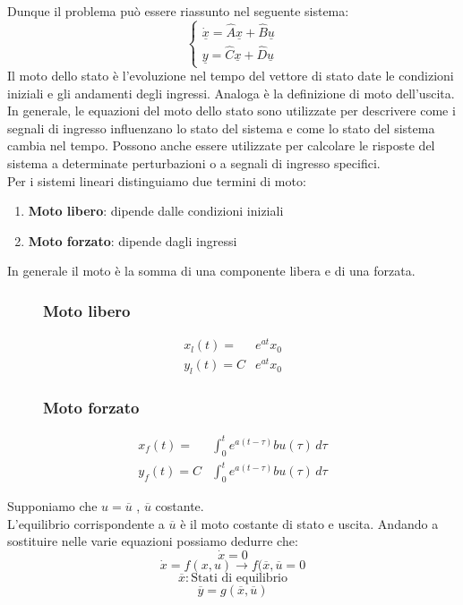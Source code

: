 	Dunque il problema può essere riassunto nel seguente sistema:
	\begin{equation*}
		\begin{cases}
			\underline{\dot{x}} = \hat{A}\underline{x}+ \hat{B}\underline{u}\\
			\underline{y} = \hat{C}\underline{x}+\hat{D}\underline{u}
		\end{cases}
	\end{equation*}
	Il moto dello stato è l'evoluzione nel tempo del vettore di stato date le condizioni iniziali e gli andamenti degli ingressi. Analoga è la definizione di moto dell'uscita. In generale, le equazioni del moto dello stato sono utilizzate per descrivere come i segnali di ingresso influenzano lo stato del sistema e come lo stato del sistema cambia nel tempo. Possono anche essere utilizzate per calcolare le risposte del sistema a determinate perturbazioni o a segnali di ingresso specifici.\\
	Per i sistemi lineari distinguiamo due termini di moto:
	\begin{enumerate}
		\item \textbf{Moto libero}: dipende dalle condizioni iniziali
		\item \textbf{Moto forzato}: dipende dagli ingressi
	\end{enumerate}
	In generale il moto è la somma di una componente libera e di una forzata.
	\begin{figure}[H]
		\begin{minipage}[t]{0.5\textwidth}
			\subsubsection{Moto libero}
			\begin{align*}
				x_l(t) = &e^{at}x_0\\
				y_l(t) = C&e^{at}x_0
			\end{align*}
		\end{minipage}
		\begin{minipage}[t]{0.5\textwidth}
			\subsubsection{Moto forzato}
			\begin{align*}
				x_f(t) = &\int^t_0 e^{a(t-\tau)}bu(\tau)\,d\tau\\
				y_f(t) =C&\int^t_0 e^{a(t-\tau)}bu(\tau)\,d\tau
			\end{align*}
		\end{minipage}
	\end{figure}
	
	Supponiamo che  $u = \overline{u}$ , $\overline{u}$ costante.\\
	L'equilibrio corrispondente a $\overline{u}$ è il moto  costante di stato e uscita. Andando a sostituire nelle varie equazioni possiamo dedurre che:
	\[    \dot{x} = 0 \]
	\[\dot{x} = f(x,u) \to f(\overline{x},\overline{u} = 0\]
	\[\overline{x} : \text{Stati di equilibrio}\]
	\[\overline{y} = g(\overline{x},\overline{u})\]

